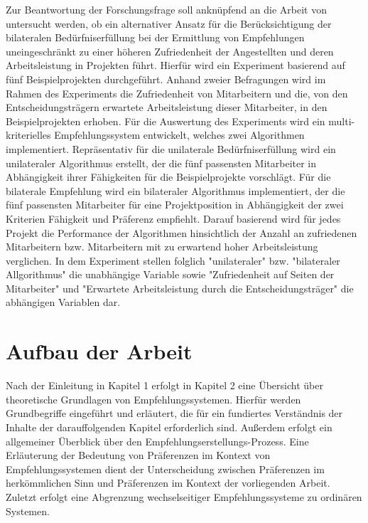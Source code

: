 Zur Beantwortung der Forschungsfrage soll anknüpfend an die Arbeit von \textcite[S. iii]{link:booklet} untersucht werden, ob ein alternativer Ansatz für die Berücksichtigung der bilateralen Bedürfniserfüllung bei der Ermittlung von Empfehlungen uneingeschränkt zu einer höheren Zufriedenheit der Angestellten und deren Arbeitsleistung in Projekten führt.
Hierfür wird ein Experiment basierend auf fünf Beispielprojekten durchgeführt.
Anhand zweier Befragungen wird im Rahmen des Experiments die Zufriedenheit von Mitarbeitern und die, von den Entscheidungsträgern erwartete Arbeitsleistung dieser Mitarbeiter, in den Beispielprojekten erhoben.
Für die Auswertung des Experiments wird ein multi-kriterielles Empfehlungssystem entwickelt, welches zwei Algorithmen implementiert.
Repräsentativ für die unilaterale Bedürfniserfüllung wird ein unilateraler Algorithmus erstellt, der die fünf passensten Mitarbeiter in Abhängigkeit ihrer Fähigkeiten für die Beispielprojekte vorschlägt.
Für die bilaterale Empfehlung wird ein bilateraler Algorithmus implementiert, der die fünf passensten Mitarbeiter für eine Projektposition in Abhängigkeit der zwei Kriterien Fähigkeit und Präferenz empfiehlt.
Darauf basierend wird für jedes Projekt die Performance der Algorithmen hinsichtlich der Anzahl an zufriedenen Mitarbeitern bzw. Mitarbeitern mit zu erwartend hoher Arbeitsleistung verglichen.
In dem Experiment stellen folglich "unilateraler" bzw. "bilateraler Allgorithmus" die unabhängige Variable sowie "Zufriedenheit auf Seiten der Mitarbeiter" und "Erwartete Arbeitsleistung durch die Entscheidungsträger" die abhängigen Variablen dar.


\section{Aufbau der Arbeit}
\label{sec:einleitung:aufbau_der_arbeit}
Nach der Einleitung in Kapitel 1 erfolgt in Kapitel 2 eine Übersicht über theoretische Grundlagen von Empfehlungssystemen.
Hierfür werden Grundbegriffe eingeführt und erläutert, die für ein fundiertes Verständnis der Inhalte der darauffolgenden Kapitel erforderlich sind.
Außerdem erfolgt ein allgemeiner Überblick über den Empfehlungserstellungs-Prozess.
Eine Erläuterung der Bedeutung von Präferenzen im Kontext von Empfehlungssystemen dient der Unterscheidung zwischen Präferenzen im herkömmlichen Sinn und Präferenzen im Kontext der vorliegenden Arbeit.
Zuletzt erfolgt eine Abgrenzung wechselseitiger Empfehlungssysteme zu ordinären Systemen. %

